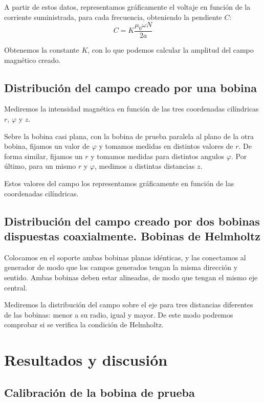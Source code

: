 \documentclass[a4paper,12pt,spanish]{article}
\begin{document}
A partir de estos datos, representamos gráficamente el voltaje en función de la corriente suministrada, para cada frecuencia, obteniendo la pendiente $C$:
\[C = K\frac{\mu_0 \omega N}{2a}\]

Obtenemos la constante $K$, con lo que podemos calcular la amplitud del campo magnético creado.

\subsection{Distribución del campo creado por una bobina}

Mediremos la intensidad magnética en función de las tres coordenadas cilíndricas $r$, $\varphi$ y $z$.

Sebre la bobina casi plana, con la bobina de prueba paralela al plano de la otra bobina, fijamos un valor de $\varphi$ y tomamos medidas en distintos valores de $r$. De forma similar, fijamos un $r$ y tomamos medidas para distintos angulos $\varphi$. Por último, para un mismo $r$ y $\varphi$, medimos a distintas distancias $z$.

Estos valores del campo los representamos gráficamente en función de las coordenadas cilíndricas.

\subsection{Distribución del campo creado por dos bobinas dispuestas coaxialmente. Bobinas de Helmholtz}

Colocamos en el soporte ambas bobinas planas idénticas, y las conectamos al generador de modo que los campos generados tengan la misma dirección y sentido. Ambas bobinas deben estar alineadas, de modo que tengan el mismo eje central.

Mediremos la distribución del campo sobre el eje para tres distancias diferentes de las bobinas: menor a su radio, igual y mayor. De este modo podremos comprobar si se verifica la condición de Helmholtz.



\section{Resultados y discusión}


\subsection{Calibración de la bobina de prueba}
\end{document}
